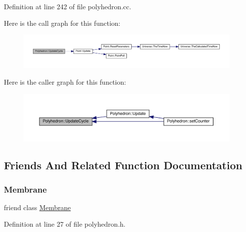 Definition at line 242 of file polyhedron.\+cc.

Here is the call graph for this function\+:
\nopagebreak
\begin{figure}[H]
\begin{center}
\leavevmode
\includegraphics[width=350pt]{class_polyhedron_a6b26174513703bc2b13f69b9cd8e1a48_cgraph}
\end{center}
\end{figure}
Here is the caller graph for this function\+:
\nopagebreak
\begin{figure}[H]
\begin{center}
\leavevmode
\includegraphics[width=350pt]{class_polyhedron_a6b26174513703bc2b13f69b9cd8e1a48_icgraph}
\end{center}
\end{figure}


\subsection{Friends And Related Function Documentation}
\mbox{\label{class_polyhedron_ac790db405644a01723104c3c0c8128bb}} 
\subsubsection{\texorpdfstring{Membrane}{Membrane}}
{\footnotesize\ttfamily friend class \hyperlink{class_membrane}{Membrane}\hspace{0.3cm}{\ttfamily [friend]}}



Definition at line 27 of file polyhedron.\+h.

\mbox{\label{class_polyhedron_aaa07b7b364b620b9a781f30a5cd9f5ea}} 
